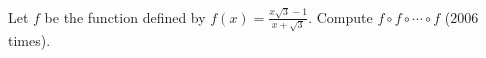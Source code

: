 Let $f$ be the function defined by $f(x) = \frac{x\sqrt{3} - 1}{x + \sqrt{3}}$. Compute $f \circ f \circ \cdots \circ f$ ($2006$ times).
